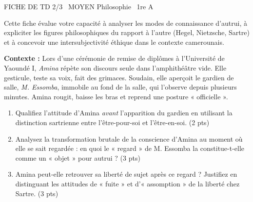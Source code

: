 \documentclass[11pt]{article}
\begin{document}
\begin{tcolorbox}[enhanced,colback=popink,colframe=popink,arc=10pt,boxrule=0pt,left=12pt,right=12pt,top=9pt,bottom=9pt]
{\color{white}\popxbold\small FICHE DE TD 2/3 \textbullet\ MOYEN \hfill Philosophie \textbullet\ 1re A\par}
\end{tcolorbox}
\vspace{4pt}
\noindent Cette fiche évalue votre capacité à analyser les modes de connaissance d'autrui, à expliciter les figures philosophiques du rapport à l'autre (Hegel, Nietzsche, Sartre) et à concevoir une intersubjectivité éthique dans le contexte camerounais.

\begin{exercice}
    \textbf{Contexte :} Lors d'une cérémonie de remise de diplômes à l'Université de Yaoundé I, \textit{Amina} répète son discours seule dans l'amphithéâtre vide. Elle gesticule, teste sa voix, fait des grimaces. Soudain, elle aperçoit le gardien de salle, \textit{M. Essomba}, immobile au fond de la salle, qui l'observe depuis plusieurs minutes. Amina rougit, baisse les bras et reprend une posture « officielle ».
    \begin{enumerate}
        \item Qualifiez l'attitude d'Amina \textit{avant} l'apparition du gardien en utilisant la distinction sartrienne entre l'être-pour-soi et l'être-en-soi. (2 pts)
        \item Analysez la transformation brutale de la conscience d'Amina au moment où elle se sait regardée : en quoi le « regard » de M. Essomba la constitue-t-elle comme un « objet » pour autrui ? (3 pts)
        \item Amina peut-elle retrouver sa liberté de sujet après ce regard ? Justifiez en distinguant les attitudes de « fuite » et d'« assomption » de la liberté chez Sartre. (3 pts)
    \end{enumerate}
\end{exercice}
\end{document}
